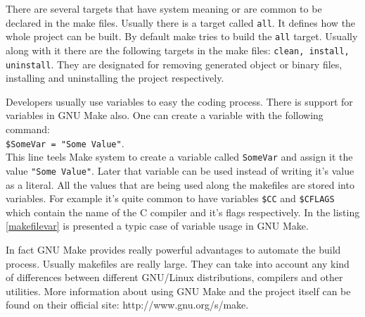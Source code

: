 There are several targets that have system meaning or are common to be declared in the make files. Usually there is a target called {\tt all}. It defines how the whole project can be built. By default make tries to build the {\tt all} target. Usually along with it there are the following targets in the make files: {\tt clean, install, uninstall}. They are designated for removing generated object or binary files, installing and uninstalling the project respectively.
	
Developers usually use variables to easy the coding process. There is support for variables in GNU Make also. One can create a variable with the following command:\\
{\tt \$SomeVar = "Some Value"}. \\
This line teels Make system to create a variable called {\tt SomeVar} and assign it the value {\tt "Some Value"}. Later that variable can be used instead of writing it's value as a literal. All the values that are being used along the makefiles are stored into variables. For example it's quite common to have variables {\tt \$CC} and {\tt \$CFLAGS} which contain the name of the C compiler and it's flags respectively.
In the listing \ref {makefilevar} is presented a typic case of variable usage in GNU Make.



In fact GNU Make provides really powerful advantages to automate the build process. Usually makefiles are really large. They can take into account any kind of differences between different GNU/Linux distributions, compilers and other utilities. More information about using GNU Make and the project itself can be found on their official site: http://www.gnu.org/s/make.

